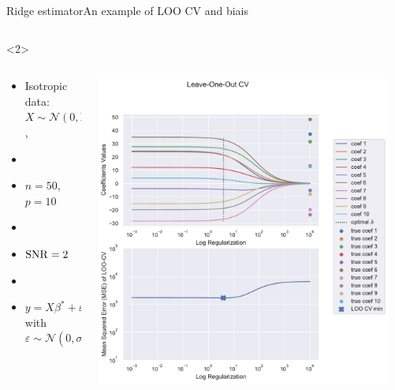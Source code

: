 \documentclass[10pt,aspectratio=43]{beamer}
\begin{document}
\begin{frame}{Ridge estimator}{An example of LOO CV and biais}
\begin{onlyenv}
\begin{columns}
\begin{column}{0.7\textwidth}
\begin{center}
                 \end{center}
            \end{column}
            \end{columns}
    \end{onlyenv}
    \begin{onlyenv}<2>
        \begin{columns}
            \begin{column}{0.4\textwidth}
                \begin{itemize}
                    \item Isotropic data: $X\sim\mathcal{N}(0,\mathrm{Id})$,
                    \item[]
                    \item $n=50$, $p=10$
                    \item[]
                    \item \textcolor{red}{$\operatorname{SNR}=2$}
                    \item[]
                    \item $y = X\beta^*+\varepsilon$ with $\varepsilon\sim \mathcal{N}(0, \sigma^2\mathrm{Id})$
                \end{itemize}
            \end{column}
            \begin{column}{0.7\textwidth}
                \begin{center}
                        \includegraphics[width=0.95\textwidth]{path_ridge_complete_2_.pdf}

\end{center}
\end{column}
\end{columns}
\end{onlyenv}
\end{frame}
\end{document}
